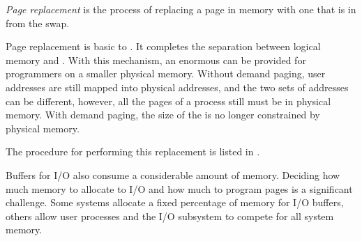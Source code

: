 \begin{definition}\label{def:Page_Replacement}
  \emph{Page replacement} is the process of replacing a page in memory with one that is  in from the swap.

  Page replacement is basic to .
  It completes the separation between logical memory and .
  With this mechanism, an enormous  can be provided for programmers on a smaller physical memory.
  Without demand paging, user addresses are still mapped into physical addresses, and the two sets of addresses can be different, however, all the pages of a process still must be in physical memory.
  With demand paging, the size of the  is no longer constrained by physical memory.

  The procedure for performing this replacement is listed in .
\end{definition}

Buffers for I/O also consume a considerable amount of memory.
Deciding how much memory to allocate to I/O and how much to program pages is a significant challenge.
Some systems allocate a fixed percentage of memory for I/O buffers, others allow user processes and the I/O subsystem to compete for all system memory.


